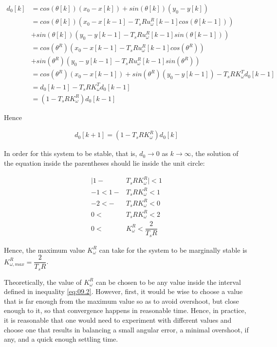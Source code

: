 \begin{align*}
  d_0[k] &= cos(\theta[k]) (x_0 - x[k]) + sin(\theta[k]) (y_0 - y[k]) \\
         &= cos(\theta[k]) (x_0 - x[k-1] - T_s R u_{\omega}^R[k-1] cos(\theta[k-1])) \\
         &+ sin(\theta[k]) (y_0 - y[k-1] - T_s R u_{\omega}^R[k-1] sin(\theta[k-1])) \\
         &= cos(\theta^R) (x_0 - x[k-1] - T_s R u_{\omega}^R[k-1] cos(\theta^R)) \\
         &+ sin(\theta^R) (y_0 - y[k-1] - T_s R u_{\omega}^R[k-1] sin(\theta^R)) \\
         &= cos(\theta^R) (x_0 - x[k-1]) + sin(\theta^R) (y_0 - y[k-1]) -T_s R K_{\omega}^T d_0[k-1]  \\
         &= d_0[k-1] - T_s R K_{\omega}^T d_0[k-1]  \\
         &= (1-T_s R K_{\omega}^R)d_0[k-1]
\end{align*}

Hence

\begin{align*}
  d_0[k+1]= (1-T_s R K_{\omega}^R)d_0[k]
\end{align*}

In order for this system to be stable, that is, $d_0 \to 0$ as $k \to \infty$,
the solution of the equation inside the parentheses should lie inside the unit
circle:

\begin{align}
  \Big|1 - &T_s R K_{\omega}^R\Big| < 1 \nonumber \\
  -1 < 1 - &T_s R K_{\omega}^R < 1 \nonumber \\
  -2 < - &T_s R K_{\omega}^R < 0 \nonumber \\
   0 <\ &T_s R K_{\omega}^R < 2 \nonumber \\
   0 <\ &K_{\omega}^R < \dfrac{2}{T_s R} \label{eq:09.2}
\end{align}

Hence, the maximum value $K_{\omega}^R$ can take for the system to be marginally
stable is $K_{\omega,max}^R = \dfrac{2}{T_s R}$.

Theoretically, the value of $K_{\omega}^R$ can be chosen to be any value inside
the interval defined in inequality \ref{eq:09.2}. However, first, it would be
wise to choose a value that is far enough from the maximum value so as to avoid
overshoot, but close enough to it, so that convergence happens in reasonable
time. Hence, in practice, it is reasonable that one would need to experiment
with different values and choose one that results in balancing a small angular
error, a minimal overshoot, if any, and a quick enough settling time.
